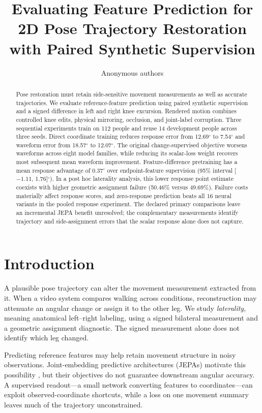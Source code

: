 \documentclass{article}
\title{Evaluating Feature Prediction for 2D Pose Trajectory Restoration with Paired Synthetic Supervision}
\author{Anonymous authors}
\newcommand{\degunit}{^{\circ}}
\begin{document}
\maketitle
\begin{abstract}
Pose restoration must retain side-sensitive movement measurements as well as accurate trajectories. We evaluate reference-feature prediction using paired synthetic supervision and a signed difference in left and right knee excursion. Rendered motion combines controlled knee edits, physical mirroring, occlusion, and joint-label corruption. Three sequential experiments train on 112 people and reuse 14 development people across three seeds. Direct coordinate training reduces response error from 12.69$\degunit$ to 7.54$\degunit$ and waveform error from 18.57$\degunit$ to 12.07$\degunit$. The original change-supervised objective worsens waveforms across eight model families, while reducing its scalar-loss weight recovers most subsequent mean waveform improvement. Feature-difference pretraining has a mean response advantage of 0.37$\degunit$ over endpoint-feature supervision (95\% interval [$-1.11$, 1.76]$\degunit$). In a post hoc laterality analysis, this lower response point estimate coexists with higher geometric assignment failure (50.46\% versus 49.69\%). Failure costs materially affect response scores, and zero-response prediction beats all 16 neural variants in the pooled response experiment. The declared primary comparisons leave an incremental JEPA benefit unresolved; the complementary measurements identify trajectory and side-assignment errors that the scalar response alone does not capture.
\end{abstract}

\section{Introduction}
A plausible pose trajectory can alter the movement measurement extracted from it. When a video system compares walking across conditions, reconstruction may attenuate an angular change or assign it to the other leg. We study \emph{laterality}, meaning anatomical left--right labeling, using a signed bilateral measurement and a geometric assignment diagnostic. The signed measurement alone does not identify which leg changed.

Predicting reference features may help retain movement structure in noisy observations. Joint-embedding predictive architectures (JEPAs) motivate this possibility \citep{assran2023ijepa,bardes2024vjepa}, but their objectives do not guarantee downstream angular accuracy. A supervised readout---a small network converting features to coordinates---can exploit observed-coordinate shortcuts, while a loss on one movement summary leaves much of the trajectory unconstrained.
\end{document}

